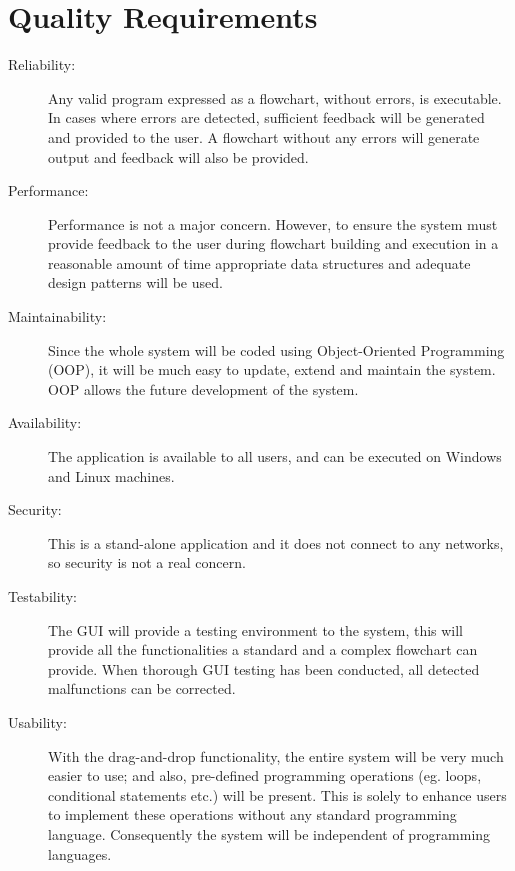 \section{Quality Requirements}
\begin{description}
  \item[Reliability:]
  	Any valid program expressed as a flowchart, without errors, is executable. In cases where errors are detected, sufficient feedback will be generated and provided to the user. A flowchart without any errors will generate output and feedback will also be provided.
 

  \item[Performance:]
  Performance is not a major concern. However, to ensure the system must provide feedback to the user during flowchart building and execution in a reasonable amount of time appropriate data structures and adequate design patterns will be used.

  \item[Maintainability:] 
  Since the whole system will be coded using Object-Oriented Programming (OOP), it will be much easy to update, extend and maintain the system. OOP allows the future development of the system.

  \item[Availability:]
  The application is available to all users, and can be executed on Windows and Linux machines.

  \item[Security:]
  This is a stand-alone application and it does not connect to any networks, so security is not a real concern.

  \item[Testability:]
  The GUI will provide a testing environment to the system, this will provide all the functionalities a standard and a complex flowchart can provide. When thorough GUI testing has been conducted, all detected malfunctions can be corrected.

  \item[Usability:]
  With the drag-and-drop functionality, the entire system will be very much easier to use; and also, pre-defined programming operations (eg. loops, conditional statements etc.) will be present. This is solely to enhance users to implement these operations without any standard programming language. Consequently the system will be independent of programming languages.
  

\end{description}
